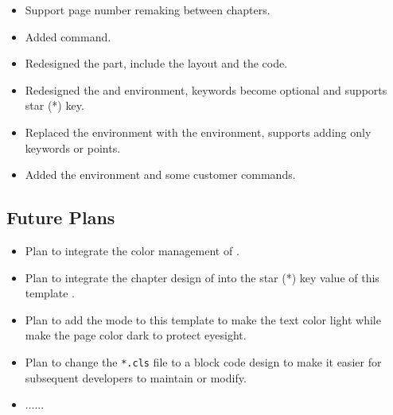 \begin{itemize}
    \item Support page number remaking between chapters.
    \item Added  command.
\end{itemize}

\begin{itemize}
    \item Redesigned the  part, include the layout and the code.
    \item Redesigned the  and  environment, keywords become optional and supports star (*) key. 
    \item Replaced the  environment with the  environment, supports adding only keywords or points.
    \item Added the  environment and some customer commands.
\end{itemize}

\subsection*{Future Plans}
\begin{itemize}
    \item Plan to integrate the color management of \href{https://www.ctan.org/pkg/elegantbook}{}.
    \item Plan to integrate the chapter design of \href{https://www.ctan.org/pkg/elegantbook}{} into the star (*) key value of this template .
    \item Plan to add the  mode to this template to make the text color light while make the page color dark to protect eyesight.
    \item Plan to change the \verb|*.cls| file to a block code design to make it easier for subsequent developers to maintain or modify.
    \item ......
\end{itemize}